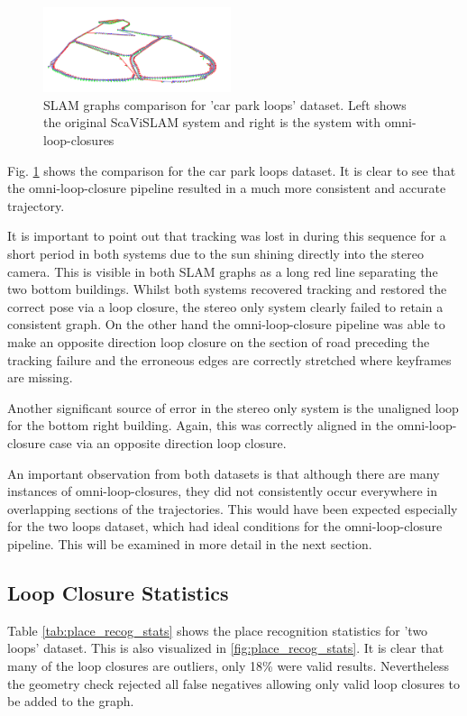 \begin{figure}[h]
    \includegraphics[width=0.49\textwidth]{chapters/images/omni_side_carpark}
  \caption{SLAM graphs comparison for 'car park loops' dataset.  Left shows the original ScaViSLAM system and right is the system with omni-loop-closures}
  \label{fig:carpark_loops_quantitative}
\end{figure}

Fig. \ref{fig:carpark_loops_quantitative} shows the comparison for the car park loops dataset.  It is clear to see that the omni-loop-closure pipeline resulted in a much more consistent and accurate trajectory.

It is important to point out that tracking was lost in during this sequence for a short period in both systems due to the sun shining directly into the stereo camera.  This is visible in both SLAM graphs as a long red line separating the two bottom buildings.  Whilst both systems recovered tracking and restored the correct pose via a loop closure, the stereo only system clearly failed to retain a consistent graph.  On the other hand the omni-loop-closure pipeline was able to make an opposite direction loop closure on the section of road preceding the tracking failure and the erroneous edges are correctly stretched where keyframes are missing.

Another significant source of error in the stereo only system is the unaligned loop for the bottom right building.  Again, this was correctly aligned in the omni-loop-closure case via an opposite direction loop closure.

An important observation from both datasets is that although there are many instances of omni-loop-closures, they did not consistently occur everywhere in overlapping sections of the trajectories.  This would have been expected especially for the two loops dataset, which had ideal conditions for the omni-loop-closure pipeline.  This will be examined in more detail in the next section.

\subsection{Loop Closure Statistics}

Table \ref{tab:place_recog_stats} shows the place recognition statistics for 'two loops' dataset.  This is also visualized in \ref{fig:place_recog_stats}.  It is clear that many of the loop closures are outliers, only 18\% were valid results.  Nevertheless the geometry check rejected all false negatives allowing only valid loop closures to be added to the graph.

